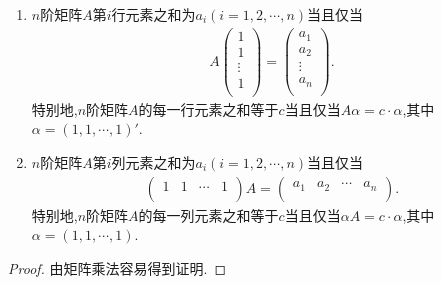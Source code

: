 \documentclass[../../main.tex]{subfiles}%
\begin{document}
\begin{proposition}[矩阵行和和列和的一种刻画]\label{proposition:对矩阵行和和列和的一种刻画}
\begin{enumerate}[(1)]
\item $n$阶矩阵$A$第$i$行元素之和为$a_i(i=1,2,\cdots,n)$当且仅当
\begin{align*}
A\left( \begin{array}{c}
1\\
1\\
\vdots\\
1\\
\end{array} \right) =\left( \begin{array}{c}
a_1\\
a_2\\
\vdots\\
a_n\\
\end{array} \right)
.
\end{align*}
特别地,$n$阶矩阵$A$的每一行元素之和等于$c$当且仅当$A\alpha=c\cdot\alpha$,其中$\alpha=(1,1,\cdots,1)'$.
\item $n$阶矩阵$A$第$i$列元素之和为$a_i(i=1,2,\cdots,n)$当且仅当
\begin{align*}
\left( \begin{matrix}
1&		1&		\cdots&		1\\
\end{matrix} \right) A=\left( \begin{matrix}
a_1&		a_2&		\cdots&		a_n\\
\end{matrix} \right). 
\end{align*}
特别地,$n$阶矩阵$A$的每一列元素之和等于$c$当且仅当$\alpha A=c\cdot\alpha$,其中$\alpha=(1,1,\cdots,1)$.
\end{enumerate}
\end{proposition}
\begin{proof}
由矩阵乘法容易得到证明.
\end{proof}
\end{document}
